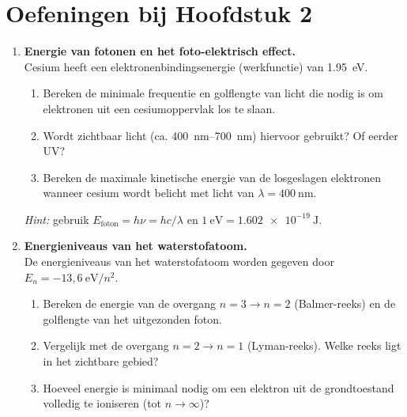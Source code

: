 \section*{Oefeningen bij Hoofdstuk 2}


\begin{enumerate}

\item \textbf{Energie van fotonen en het foto-elektrisch effect.} \\
Cesium heeft een elektronenbindingsenergie (werkfunctie) van \SI{1.95}{\electronvolt}.
\begin{enumerate}
\item[(a)] Bereken de minimale frequentie en golflengte van licht die nodig is om elektronen uit een cesiumoppervlak los te slaan.
\item[(b)] Wordt zichtbaar licht (ca. \SIrange{400}{700}{\nano\metre}) hiervoor gebruikt? Of eerder UV?
\item[(c)] Bereken de maximale kinetische energie van de losgeslagen elektronen wanneer cesium wordt belicht met licht van \(\lambda = \SI{400}{\nano\metre}\).
\end{enumerate}
\emph{Hint:} gebruik $E_{\text{foton}} = h\nu = hc/\lambda$ en $1~\mathrm{eV} = \SI{1.602e-19}{\joule}$.

\item \textbf{Energieniveaus van het waterstofatoom.} \\
De energieniveaus van het waterstofatoom worden gegeven door $E_n = -13{,}6~\mathrm{eV}/n^2$.
\begin{enumerate}
\item[(a)] Bereken de energie van de overgang $n=3 \to n=2$ (Balmer-reeks) en de golflengte van het uitgezonden foton.
\item[(b)] Vergelijk met de overgang $n=2 \to n=1$ (Lyman-reeks). Welke reeks ligt in het zichtbare gebied?
\item[(c)] Hoeveel energie is minimaal nodig om een elektron uit de grondtoestand volledig te ioniseren (tot $n \to \infty$)?
\end{enumerate}


\end{enumerate}
